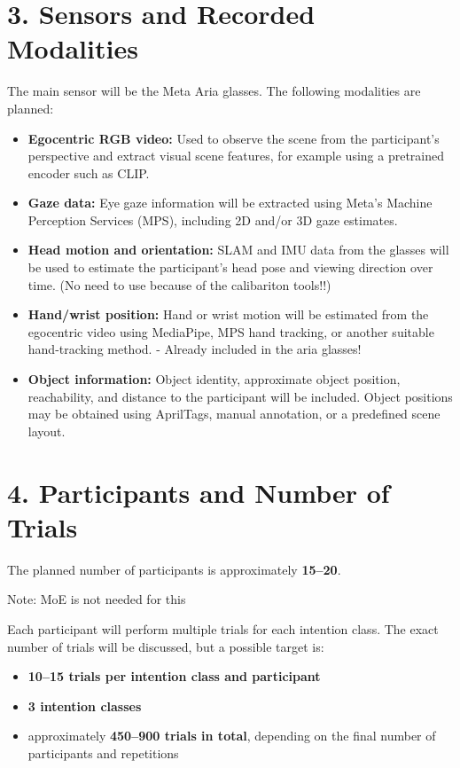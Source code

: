 \documentclass[11pt,a4paper]{article}
\begin{document}
\section*{3. Sensors and Recorded Modalities}

The main sensor will be the Meta Aria glasses. The following modalities are planned:

\begin{itemize}
    \item \textbf{Egocentric RGB video:} Used to observe the scene from the participant's perspective and extract visual scene features, for example using a pretrained encoder such as CLIP.
    
    \item \textbf{Gaze data:} Eye gaze information will be extracted using Meta's Machine Perception Services (MPS), including 2D and/or 3D gaze estimates.
    
    \item \textbf{Head motion and orientation:} SLAM and IMU data from the glasses will be used to estimate the participant's head pose and viewing direction over time.
    (No need to use because of the calibariton tools!!)
    
    \item \textbf{Hand/wrist position:} Hand or wrist motion will be estimated from the egocentric video using MediaPipe, MPS hand tracking, or another suitable hand-tracking method.
    - Already included in the aria glasses!
    
    \item \textbf{Object information:} Object identity, approximate object position, reachability, and distance to the participant will be included. Object positions may be obtained using AprilTags, manual annotation, or a predefined scene layout.
\end{itemize}

\section*{4. Participants and Number of Trials}

The planned number of participants is approximately \textbf{15--20}.

Note: MoE is not needed for this

Each participant will perform multiple trials for each intention class. The exact number of trials will be discussed, but a possible target is:

\begin{itemize}
    \item \textbf{10--15 trials per intention class and participant}
    \item \textbf{3 intention classes}
    \item approximately \textbf{450--900 trials in total}, depending on the final number of participants and repetitions
\end{itemize}
\end{document}
